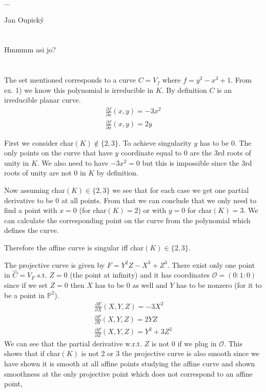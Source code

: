 \documentclass[12pt, a4paper]{article}
\begin{document}
\begin{center}
\large ...

\normalsize Jan Oupický
\end{center}
\vspace{1\baselineskip}

\section{}
Hmmmm asi jo?

\section{}
The set mentioned corresponds to a curve $C= V_f$ where $f=y^2-x^3+1$. From ex. 1) we know this polynomial is irreducible in $K$. By definition $C$ is an irreducible planar curve.
\begin{gather*}
\frac{\partial f}{\partial x} (x,y) = -3x^2\\
\frac{\partial f}{\partial x} (x,y) = 2y
\end{gather*}

First we consider char$(K) \notin \{2,3\}$. To achieve singularity $y$ has to be $0$. The only points on the curve that have $y$ coordinate equal to $0$ are the 3rd roots of unity in $K$. We also need to have $-3x^2 = 0$ but this is impossible since the 3rd roots of unity are not $0$ in $K$ by definition.

Now assuming char$(K) \in \{2,3\}$ we see that for each case we get one partial derivative to be 0 at all points. From that we can conclude that we only need to find a point with $x=0$ (for char$(K)=2$) or with $y=0$ for char$(K)=3$. We can calculate the corresponding point on the curve from the polynomial which defines the curve.

Therefore the affine curve is singular iff char$(K) \in \{2,3\}$.

The projective curve is given by $F= Y^2Z-X^3+Z^3$. There exist only one point in $\hat{C} = V_F$ s.t. $Z = 0$ (the point at infinity) and it has coordinates $\mathcal{O} = (0:1:0)$ since if we set $Z=0$ then $X$ has to be $0$ as well and $Y$ has to be nonzero (for it to be a point in $\mathbb{P}^2$).
\begin{gather*}
\frac{\partial F}{\partial X} (X,Y,Z) = -3X^2\\
\frac{\partial F}{\partial Y} (X,Y,Z) = 2YZ\\
\frac{\partial F}{\partial Z} (X,Y,Z) = Y^2+3Z^2
\end{gather*}
We can see that the partial derivative w.r.t. $Z$ is not $0$ if we plug in $\mathcal{O}$. This shows that if char$(K)$ is not 2 or 3 the projective curve is also smooth since we have shown it is smooth at all affine points studying the affine curve and shown smoothness at the only projective point which does not correspond to an affine point,
\end{document}
